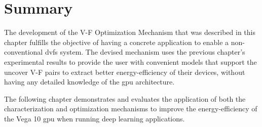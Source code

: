 \section{Summary}

The development of the V-F Optimization Mechanism that was described in this chapter fulfills the objective of having a concrete application to enable a non-conventional \acrshort{dvfs} system. The devised mechanism uses the previous chapter's experimental results to provide the user with convenient models that support the uncover V-F pairs to extract better energy-efficiency of their devices, without having any detailed knowledge of the \acrshort{gpu} architecture.

The following chapter demonstrates and evaluates the application of both the characterization and optimization mechanisms to improve the energy-efficiency of the Vega 10 \acrshort{gpu} when running deep learning applications.

